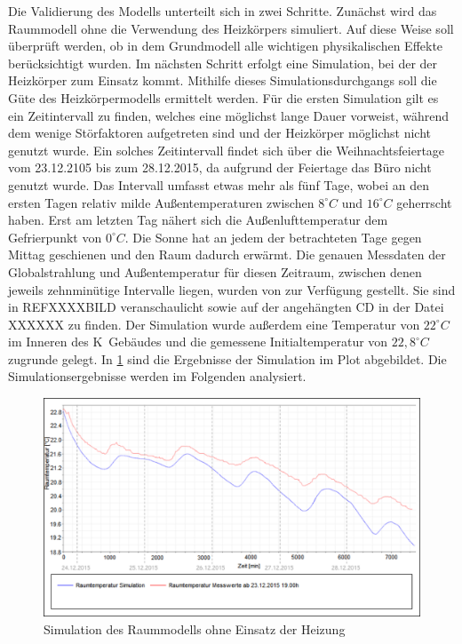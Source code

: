 Die Validierung des Modells unterteilt sich in zwei Schritte. Zunächst wird das Raummodell ohne die Verwendung des Heizkörpers simuliert. Auf diese Weise soll überprüft werden, ob in dem Grundmodell alle wichtigen physikalischen Effekte berücksichtigt wurden. Im nächsten Schritt erfolgt eine Simulation, bei der der Heizkörper zum Einsatz kommt. Mithilfe  dieses Simulationsdurchgangs soll die Güte des Heizkörpermodells ermittelt werden.
Für die ersten Simulation gilt es ein Zeitintervall zu finden, welches eine möglichst lange Dauer vorweist, während dem wenige Störfaktoren aufgetreten sind und der Heizkörper möglichst nicht genutzt wurde. Ein solches Zeitintervall findet sich über die Weihnachtsfeiertage vom 23.12.2105 bis zum 28.12.2015, da aufgrund der Feiertage das Büro nicht genutzt wurde.
Das Intervall umfasst etwas mehr als fünf Tage, wobei an den ersten Tagen relativ milde Außentemperaturen zwischen $8^{\circ}C$ und $16^{\circ}C$ geherrscht haben. Erst am letzten Tag nähert sich die Außenlufttemperatur dem Gefrierpunkt von $0^{\circ}C$. Die Sonne hat an jedem der betrachteten Tage gegen Mittag geschienen und den Raum dadurch erwärmt.
Die genauen Messdaten der Globalstrahlung und Außentemperatur für diesen Zeitraum, zwischen denen jeweils zehnminütige Intervalle liegen, wurden von \cite{wetter} zur Verfügung gestellt. Sie sind in REFXXXXBILD veranschaulicht sowie auf der angehängten CD in der Datei XXXXXX zu finden.
Der Simulation wurde außerdem eine Temperatur von $22^{\circ}C$ im Inneren des K~Gebäudes und die gemessene Initialtemperatur von $22,8^{\circ}C$ zugrunde gelegt. In \ref{fig:valid1} sind die Ergebnisse der Simulation im Plot abgebildet. Die Simulationsergebnisse  werden im Folgenden analysiert.


\begin{figure}
\centering
\includegraphics[width=\textwidth]{abbildungen/20160328_validierung1}
\caption{Simulation des Raummodells ohne Einsatz der Heizung}
\label{fig:valid1}
\end{figure}

